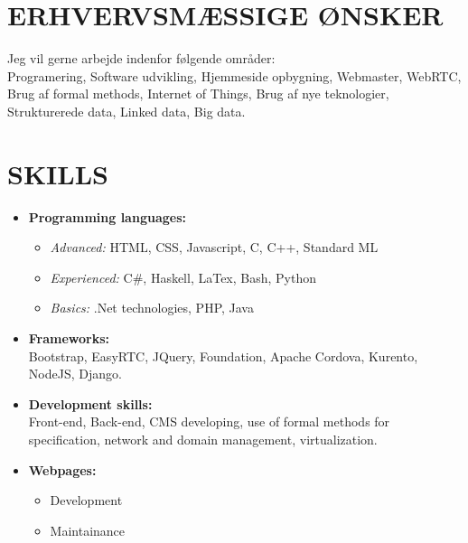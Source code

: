 \documentclass[11pt,a4paper,sans]{moderncv}        %
\begin{document}
\section{ERHVERVSMÆSSIGE ØNSKER}
Jeg vil gerne arbejde indenfor følgende områder:\\
Programering, Software udvikling, Hjemmeside opbygning, Webmaster, WebRTC, Brug af formal methods, Internet of Things, Brug af nye teknologier, Strukturerede data, Linked data, Big data.
\fi

\ifenglish
\section{SKILLS}
\begin{itemize}
\item \textbf{Programming languages:}
\begin{itemize}
\item \textit{Advanced:} HTML, CSS, Javascript, C, C++, Standard ML
\item \textit{Experienced:} C\#, Haskell, LaTex, Bash, Python
\item \textit{Basics:} .Net technologies, PHP, Java
\end{itemize}
\bigskip

\item \textbf{Frameworks:}\\
Bootstrap, EasyRTC, JQuery, Foundation, Apache Cordova, Kurento, NodeJS, Django.
\bigskip

\item \textbf{Development skills:}\\
Front-end, Back-end, CMS developing, use of formal methods for specification, network and domain management, virtualization.
\bigskip

\item \textbf{Webpages:}
\begin{itemize}
\item Development
\item Maintainance
\end{itemize}
\end{itemize}
\else
\end{document}
